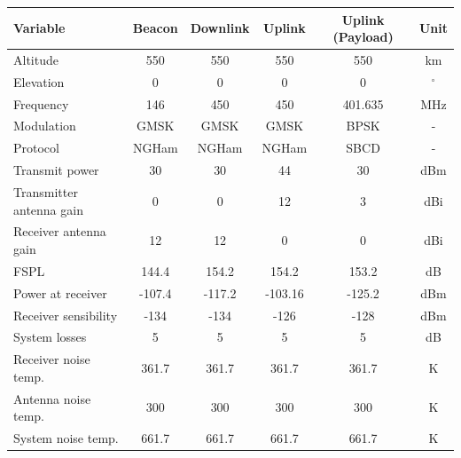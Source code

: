 \begin{table}[!h]
    \centering
    \begin{tabular}{L{0.3\textwidth}ccccc}
        \toprule[1.5pt]
        \textbf{Variable} & \textbf{Beacon} & \textbf{Downlink} & \textbf{Uplink} & \textbf{Uplink (Payload)} & \textbf{Unit}\\
        \midrule
        Altitude                        & 550           & 550           & 550           & 550           & km \\
        Elevation                       & 0             & 0             & 0             & 0             & $^{\circ}$ \\
        Frequency                       & 146           & 450           & 450           & 401.635       & MHz \\
        Modulation                      & GMSK          & GMSK          & GMSK          & BPSK          & - \\
        Protocol                        & NGHam         & NGHam         & NGHam         & SBCD          & - \\
        Transmit power                  & 30            & 30            & 44            & 30            & dBm \\
        Transmitter antenna gain        & 0             & 0             & 12            & 3             & dBi \\
        Receiver antenna gain           & 12            & 12            & 0             & 0             & dBi \\
        FSPL                            & 144.4         & 154.2         & 154.2         & 153.2         & dB \\
        Power at receiver               & -107.4        & -117.2        & -103.16        & -125.2        & dBm \\
        Receiver sensibility            & -134          & -134          & -126          & -128          & dBm \\
        System losses                   & 5             & 5             & 5             & 5             & dB \\
        Receiver noise temp.            & 361.7         & 361.7         & 361.7         & 361.7         & K \\
        Antenna noise temp.             & 300           & 300           & 300           & 300           & K \\
        System noise temp.              & 661.7         & 661.7         & 661.7         & 661.7         & K \\

\end{tabular}
\end{table}
